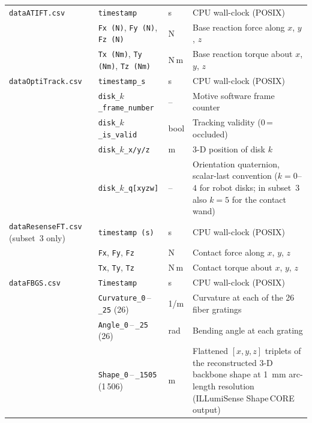 \documentclass[14pt, a4paper]{article}
\begin{document}
\begin{longtable}{@{} p{3.8cm} p{4.8cm} p{1.2cm} p{5.6cm} @{}}
  \hline
\texttt{dataATIFT.csv}
  & \texttt{timestamp}                       & s     & CPU wall-clock (POSIX) \\
  & \texttt{Fx (N)}, \texttt{Fy (N)}, \texttt{Fz (N)}       & N     & Base reaction force along $x$, $y$, $z$ \\
  & \texttt{Tx (Nm)}, \texttt{Ty (Nm)}, \texttt{Tz (Nm)}    & N\,m  & Base reaction torque about $x$, $y$, $z$ \\[4pt]
  \hline
\texttt{dataOptiTrack.csv}
  & \texttt{timestamp\_s}                    & s     & CPU wall-clock (POSIX) \\
  & \texttt{disk\_$k$\_frame\_number}        & --    & Motive software frame counter \\
  & \texttt{disk\_$k$\_is\_valid}            & bool  & Tracking validity (0\,=\,occluded) \\
  & \texttt{disk\_$k$\_x/y/z}               & m     & 3-D position of disk $k$ \\
  & \texttt{disk\_$k$\_q[xyzw]}             & --    & Orientation quaternion, scalar-last convention ($k=0$--$4$ for robot disks; in subset~3 also $k=5$ for the contact wand) \\[4pt]
  \hline
\texttt{dataResenseFT.csv} \newline (subset~3 only)
  & \texttt{timestamp (s)}                   & s     & CPU wall-clock (POSIX) \\
  & \texttt{Fx}, \texttt{Fy}, \texttt{Fz}   & N     & Contact force along $x$, $y$, $z$ \\
  & \texttt{Tx}, \texttt{Ty}, \texttt{Tz}   & N\,m  & Contact torque about $x$, $y$, $z$ \\[4pt]
  \hline
\texttt{dataFBGS.csv}
  & \texttt{Timestamp}                       & s     & CPU wall-clock (POSIX) \\
  & \texttt{Curvature\_0}\,--\,\texttt{\_25} (26) & 1/m & Curvature at each of the 26 fiber gratings \\
  & \texttt{Angle\_0}\,--\,\texttt{\_25} (26)    & rad  & Bending angle at each grating \\
  & \texttt{Shape\_0}\,--\,\texttt{\_1505} (1\,506) & m & Flattened $[x,y,z]$ triplets of the reconstructed 3-D backbone shape at \SI{1}{\milli\meter} arc-length resolution (ILLumiSense Shape\,CORE output) \\[6pt]
  \hline

\end{longtable}
\end{document}
